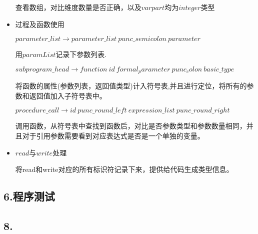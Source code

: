 \documentclass[]{ctexart}
\begin{document}
\begin{itemize}
  查看数组，对比维度数量是否正确，以及\(varpart\)均为\(integer\)类型
\item
  过程及函数使用

  \(parameter\_list\to parameter\_list\ punc\_semicolon\ parameter\)

  用\(paramList\)记录下参数列表.

  \(subprogram\_head\to function\ id\ formal_parameter\ punc_colon\ basic\_type\)

  将函数的属性(参数列表，返回值类型)计入符号表,并且进行定位，将所有的参数和返回值加入子符号表中。

  \(procedure\_call\to id\ punc\_round\_left\ expression\_list\ punc\_round\_right\)

  调用函数，从符号表中查找到函数后，对比是否参数类型和参数数量相同，并且对于引用参数需要看到对应表达式是否是一个单独的变量。
\end{itemize}

\begin{itemize}
\item
  \(read\)与\(write\)处理

  将read和write对应的所有标识符记录下来，提供给代码生成类型信息。
\end{itemize}

\hypertarget{header-n251}{%
\subsection{6.程序测试}\label{header-n251}}

\hypertarget{header-n252}{%
\subsection{8.}\label{header-n252}}
\end{document}
